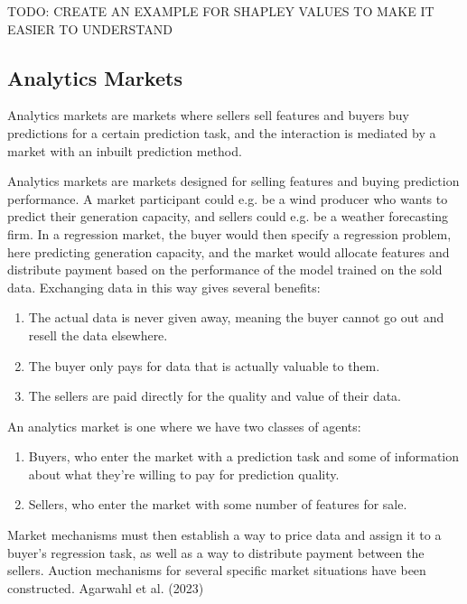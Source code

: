 TODO: CREATE AN EXAMPLE FOR SHAPLEY VALUES TO MAKE IT EASIER TO UNDERSTAND




\subsection{Analytics Markets}
Analytics markets are markets where sellers sell features and buyers buy
predictions for a certain prediction task, and the interaction is mediated by a
market with an inbuilt prediction method.


Analytics markets are markets designed for selling features and buying
prediction performance. A market participant could e.g. be a wind producer who
wants to predict their generation capacity, and sellers could e.g. be a weather
forecasting firm.  In a regression market, the buyer would then specify a
regression problem, here predicting generation capacity, and the market would
allocate features and distribute payment based on the performance of the model
trained on the sold data. Exchanging data in this way gives several benefits:

\begin{enumerate}
    \item The actual data is never given away, meaning the buyer cannot go out and resell the data elsewhere.
    \item The buyer only pays for data that is actually valuable to them.
    \item The sellers are paid directly for the quality and value of their data.
\end{enumerate}

An analytics market is one where we have two classes of agents:

\begin{enumerate}
    \item Buyers, who enter the market with a prediction task and some of
      information about what they're willing to pay for prediction quality.
    \item Sellers, who enter the market with some number of features for sale.
\end{enumerate}

Market mechanisms must then establish a way to price data and assign it to a
buyer's regression task, as well as a way to distribute payment between the
sellers. Auction mechanisms for several specific market situations have been
constructed. Agarwahl et al. (2023) %

